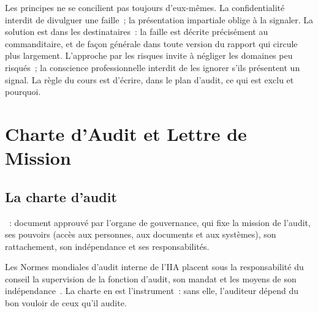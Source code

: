 Les principes ne se concilient pas toujours d'eux-mêmes. La
confidentialité interdit de divulguer une faille~; la présentation
impartiale oblige à la signaler. La solution est dans les destinataires~:
la faille est décrite précisément au commanditaire, et de façon générale
dans toute version du rapport qui circule plus largement. L'approche par les
risques invite à négliger les domaines peu risqués~; la conscience
professionnelle interdit de les ignorer s'ils présentent un signal. La
règle du cours est d'écrire, dans le plan d'audit, ce qui est exclu et
pourquoi.

\section{Charte d'Audit et Lettre de Mission}
\label{sec:c07-charte}

\subsection{La charte d'audit}

\begin{boxdef}
~: document approuvé par
l'organe de gouvernance, qui fixe la mission de l'audit, ses pouvoirs (accès
aux personnes, aux documents et aux systèmes), son rattachement, son
indépendance et ses responsabilités.
\end{boxdef}

Les Normes mondiales d'audit interne de l'IIA placent sous la
responsabilité du conseil la supervision de la fonction d'audit, son mandat
et les moyens de son indépendance~\cite{iia2024gias}. La charte en est
l'instrument~: sans elle, l'auditeur dépend du bon vouloir de ceux qu'il
audite.

